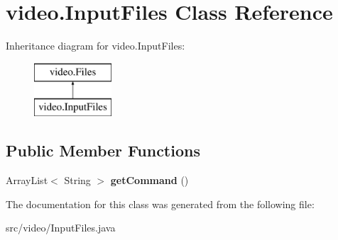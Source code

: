 \hypertarget{classvideo_1_1_input_files}{
\section{video.InputFiles Class Reference}
\label{classvideo_1_1_input_files}
}
Inheritance diagram for video.InputFiles:\begin{figure}[H]
\begin{center}
\leavevmode
\includegraphics[height=2.000000cm]{classvideo_1_1_input_files}
\end{center}
\end{figure}
\subsection*{Public Member Functions}
\begin{DoxyCompactItemize}
\item 
\hypertarget{classvideo_1_1_input_files_af0b28d1db7ff90e546ac335ca527cc5b}{
ArrayList$<$ String $>$ {\bfseries getCommand} ()}
\label{classvideo_1_1_input_files_af0b28d1db7ff90e546ac335ca527cc5b}

\end{DoxyCompactItemize}


The documentation for this class was generated from the following file:\begin{DoxyCompactItemize}
\item 
src/video/InputFiles.java\end{DoxyCompactItemize}
